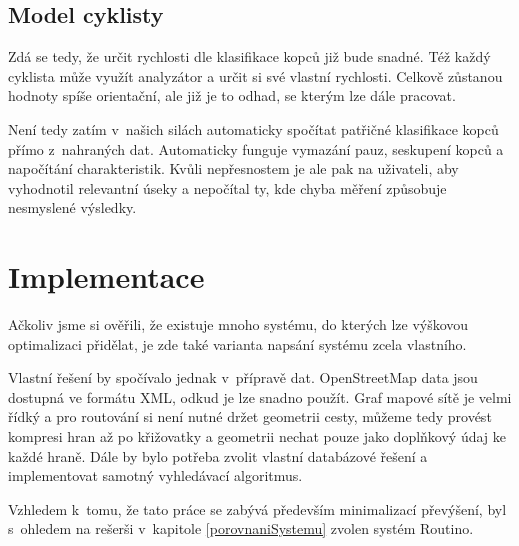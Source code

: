 \documentclass[thesis=B,czech]{FITthesis}[2012/06/26]
\begin{document}
\section{Model cyklisty}
Zdá se tedy, že určit rychlosti dle klasifikace kopců již bude snadné. Též každý cyklista může využít analyzátor a určit si své vlastní rychlosti. Celkově zůstanou hodnoty spíše orientační, ale již je to odhad, se kterým lze dále pracovat.

Není tedy zatím v~našich silách automaticky spočítat patřičné klasifikace kopců přímo z~nahraných dat. Automaticky funguje vymazání pauz, seskupení kopců a napočítání charakteristik. Kvůli nepřesnostem je ale pak na uživateli, aby vyhodnotil relevantní úseky a nepočítal ty, kde chyba měření způsobuje nesmyslené výsledky.
























\chapter{Implementace}
Ačkoliv jsme si ověřili, že existuje mnoho systému, do kterých lze výškovou optimalizaci přidělat, je zde také varianta napsání systému zcela vlastního.

Vlastní řešení by spočívalo jednak v~přípravě dat. OpenStreetMap data jsou dostupná ve formátu XML, odkud je lze snadno použít. Graf mapové sítě je velmi řídký a pro routování si není nutné držet geometrii cesty, můžeme tedy provést kompresi hran až po křižovatky a geometrii nechat pouze jako doplňkový údaj ke každé hraně. Dále by bylo potřeba zvolit vlastní databázové řešení a implementovat samotný vyhledávací algoritmus.

Vzhledem k~tomu, že tato práce se zabývá především minimalizací převýšení, byl s~ohledem na rešerši v~kapitole \ref{porovnaniSystemu} zvolen systém Routino.
\end{document}
